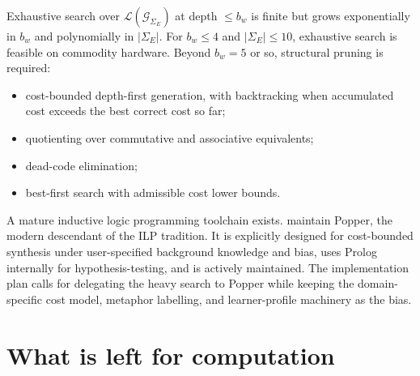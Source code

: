 \documentclass[11pt]{article}
\begin{document}
Exhaustive search over $\mathcal{L}(\mathcal{G}_{\Sigma_E})$ at depth
$\le b_w$ is finite but grows exponentially in $b_w$ and polynomially
in $|\Sigma_E|$. For $b_w \le 4$ and $|\Sigma_E| \le 10$, exhaustive
search is feasible on commodity hardware. Beyond $b_w = 5$ or so,
structural pruning is required:
\begin{itemize}[noitemsep,topsep=2pt]
  \item cost-bounded depth-first generation, with backtracking when
        accumulated cost exceeds the best correct cost so far;
  \item quotienting over commutative and associative equivalents;
  \item dead-code elimination;
  \item best-first search with admissible cost lower bounds.
\end{itemize}

A mature inductive logic programming toolchain exists.
\textcite{cropper2021popper, cropper2020ilp} maintain Popper, the
modern descendant of the ILP tradition. It is explicitly designed for
cost-bounded synthesis under user-specified background knowledge and
bias, uses Prolog internally for hypothesis-testing, and is actively
maintained. The implementation plan calls for delegating the heavy
search to Popper while keeping the domain-specific cost model,
metaphor labelling, and learner-profile machinery as the bias.

\section{What is left for computation}
\end{document}
